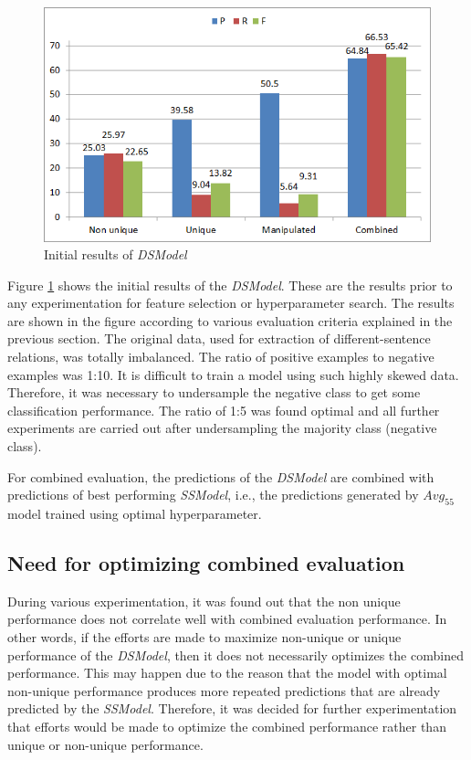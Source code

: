 \begin{figure}
\centering
\includegraphics[scale=0.7]{figures/DSInitialResults.png}
\caption{Initial results of \textit{DSModel}}\label{fig:DSInitial}
\end{figure}

Figure \ref{fig:DSInitial} shows the initial results of the \textit{DSModel}. These are the results prior to any experimentation for feature selection or hyperparameter search. The results are shown in the figure according to various evaluation criteria explained in the previous section. The original data, used for extraction of different-sentence relations, was totally imbalanced. The ratio of positive examples to negative examples was 1:10. It is difficult to train a model using such highly skewed data. Therefore, it was necessary to undersample \cite{akbani2004applying} the negative class to get some classification performance. The ratio of 1:5 was found optimal and all further experiments are carried out after undersampling the majority class (negative class).

For combined evaluation, the predictions of the \textit{DSModel} are combined with predictions of best performing \textit{SSModel}, i.e., the predictions generated by $Avg_{55}$ model trained using optimal hyperparameter.

\subsection{Need for optimizing combined evaluation}

During various experimentation, it was found out that the non unique performance does not correlate well with combined evaluation performance. In other words, if the efforts are made to maximize non-unique or unique performance of the \textit{DSModel}, then it does not necessarily optimizes the combined performance.  This may happen due to the reason that the model with optimal non-unique performance produces more repeated predictions that are already predicted by the \textit{SSModel}. Therefore, it was decided for further experimentation that efforts would be made to optimize the combined performance rather than unique or non-unique performance.

